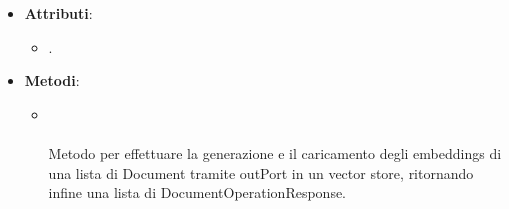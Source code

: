 \documentclass[10pt, a4paper]{article}
\begin{document}
\label{EmbeddingsUploaderDettaglio}
\begin{itemize}
    \item \textbf{Attributi}:
    \begin{itemize}
        \item {}.
    \end{itemize}
    \item \textbf{Metodi}:
    \begin{itemize}
        \item {}\\ \\
        Metodo per effettuare la generazione e il caricamento degli embeddings di una lista di Document tramite outPort in un vector store, ritornando infine una lista di DocumentOperationResponse.
    \end{itemize}
\end{itemize}
\end{document}

